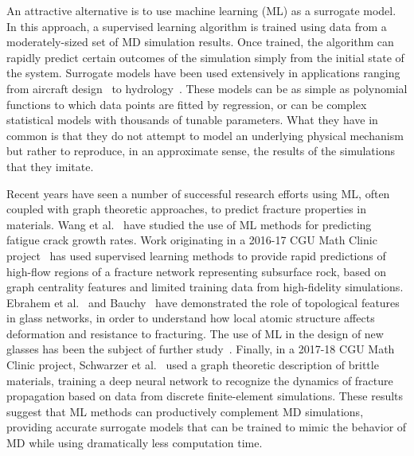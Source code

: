 An attractive alternative is to use machine learning (ML) as a surrogate model.  In this approach, a supervised learning algorithm is trained using data from a moderately-sized set of MD simulation results.  Once trained, the algorithm can rapidly predict certain outcomes of the simulation simply from the initial state of the system.  Surrogate models have been used extensively in applications ranging from aircraft design~\cite{mack2007surrogate} to hydrology~\cite{razavi2012review}.  These models can be as simple as polynomial functions to which data points are fitted by regression, or can be complex statistical models with thousands of tunable parameters.  What they have in common is that they do not attempt to model an underlying physical mechanism but rather to reproduce, in an approximate sense, the results of the simulations that they imitate.

Recent years have seen a number of successful research efforts using ML, often coupled with graph theoretic approaches, to predict fracture properties in materials. Wang et al.~\cite{MLACrack} have studied the use of ML methods for predicting fatigue crack growth rates. Work originating in a 2016-17 CGU Math Clinic project~\cite{valera2018machine,TopSystem} has used supervised learning methods to provide rapid predictions of high-flow regions of a fracture network representing subsurface rock, based on graph centrality features and limited training data from high-fidelity simulations.  Ebrahem et al.~\cite{ebrahem2018influence} and Bauchy~\cite{bauchy} have demonstrated the role of topological features in glass networks, in order to understand how local atomic structure affects deformation and resistance to fracturing.  The use of ML in the design of new glasses has been the subject of further study~\cite{liu2019machine}.  Finally, in a 2017-18 CGU Math Clinic project, Schwarzer et al.~\cite{schwarzer2019learning,mudunuru2019} used a graph theoretic description of brittle materials, training a deep neural network to recognize the dynamics of fracture propagation based on data from discrete finite-element simulations.  These results suggest that ML methods can productively complement MD simulations, providing accurate surrogate models that can be trained to mimic the behavior of MD while using dramatically less computation time.


